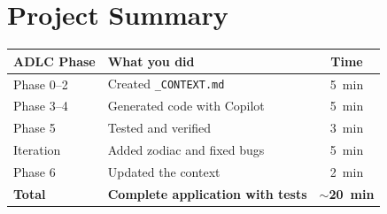 \section*{Project Summary}

\begin{center}
\begin{tabularx}{\textwidth}{l X c}
\toprule
\textbf{ADLC Phase} & \textbf{What you did} & \textbf{Time} \\
\midrule
Phase 0--2 & Created \texttt{\_CONTEXT.md} & 5~min \\
Phase 3--4 & Generated code with Copilot & 5~min \\
Phase 5 & Tested and verified & 3~min \\
Iteration & Added zodiac and fixed bugs & 5~min \\
Phase 6 & Updated the context & 2~min \\
\midrule
\textbf{Total} & \textbf{Complete application with tests} & \textbf{$\sim$20~min} \\
\bottomrule
\end{tabularx}
\end{center}
